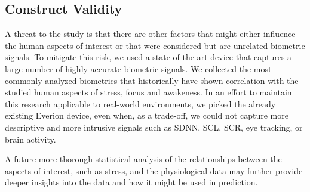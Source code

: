 \subsection{Construct Validity}
A threat to the study is that
there are other factors that might either influence the
human aspects of interest or that were considered but
are unrelated biometric signals.
To mitigate this risk, we used a state-of-the-art
device that captures a large number of highly accurate biometric
signals. We collected the most commonly analyzed
biometrics that historically have shown correlation with 
the studied human aspects of stress, focus and awakeness.
In an effort to maintain this research applicable to real-world environments, we picked the already existing Everion device, even when, as a trade-off, we could not capture more descriptive and more intrusive signals such as SDNN, SCL, SCR, eye tracking, or brain activity.

A future more thorough statistical analysis of the relationships between
the aspects of interest, such as stress, and the physiological
data may further provide deeper insights into the data and
how it might be used in prediction.











